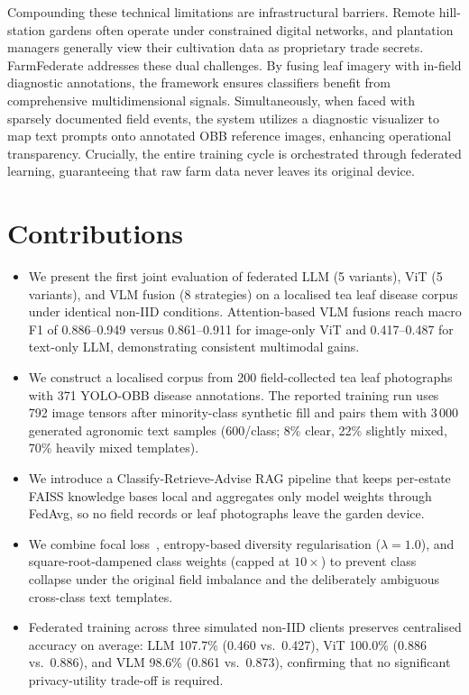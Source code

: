 \documentclass[12pt, a4paper, oneside]{Thesis}
\begin{document}
Compounding these technical limitations are infrastructural barriers. Remote hill-station gardens often operate under constrained digital networks, and plantation managers generally view their cultivation data as proprietary trade secrets. FarmFederate addresses these dual challenges. By fusing leaf imagery with in-field diagnostic annotations, the framework ensures classifiers benefit from comprehensive multidimensional signals. Simultaneously, when faced with sparsely documented field events, the system utilizes a diagnostic visualizer to map text prompts onto annotated OBB reference images, enhancing operational transparency. Crucially, the entire training cycle is orchestrated through federated learning, guaranteeing that raw farm data never leaves its original device.

\section{Contributions}

\begin{itemize}
  \item We present the first joint evaluation of federated LLM (5 variants), ViT
        (5 variants), and VLM fusion (8 strategies) on a localised tea leaf disease
        corpus under identical non-IID conditions. Attention-based VLM fusions reach
        macro F1 of 0.886--0.949 versus 0.861--0.911 for image-only ViT and
        0.417--0.487 for text-only LLM, demonstrating consistent multimodal gains.
  \item We construct a localised corpus from 200 field-collected tea leaf
        photographs with 371 YOLO-OBB disease annotations. The reported training
        run uses 792 image tensors after minority-class synthetic fill and pairs
        them with 3\,000 generated agronomic text samples (600/class; 8\% clear,
        22\% slightly mixed, 70\% heavily mixed templates).
  \item We introduce a Classify-Retrieve-Advise RAG pipeline that keeps per-estate
        FAISS knowledge bases local and aggregates only model weights through FedAvg,
        so no field records or leaf photographs leave the garden device.
  \item We combine focal loss~\cite{Lin2017}, entropy-based diversity regularisation
        ($\lambda{=}1.0$), and square-root-dampened class weights (capped at $10\times$)
        to prevent class collapse under the original field imbalance and the
        deliberately ambiguous cross-class text templates.
  \item Federated training across three simulated non-IID clients preserves
        centralised accuracy on average: LLM 107.7\% (0.460 vs.\ 0.427),
        ViT 100.0\% (0.886 vs.\ 0.886), and VLM 98.6\% (0.861 vs.\ 0.873),
        confirming that no significant privacy-utility trade-off is required.
\end{itemize}
\end{document}
